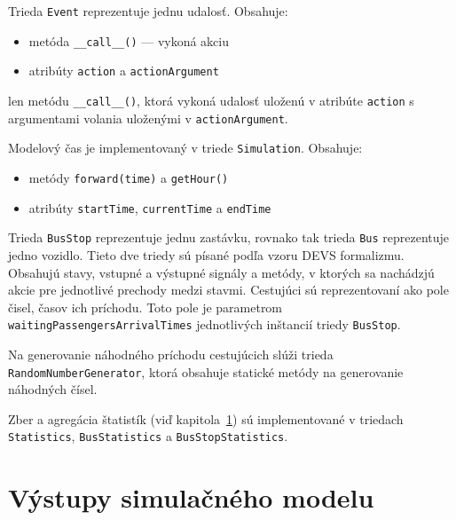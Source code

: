 Trieda \texttt{Event} reprezentuje jednu udalosť.
Obsahuje:
\begin{itemize}
  \item metóda \texttt{\_\_call\_\_()} --- vykoná akciu
  \item atribúty \texttt{action} a \texttt{actionArgument}
\end{itemize}

len metódu \texttt{\_\_call\_\_()}, ktorá vykoná udalosť uloženú v atribúte \texttt{action} s argumentami volania uloženými v \texttt{actionArgument}.

Modelový čas je implementovaný v triede \texttt{Simulation}.
Obsahuje:
\begin{itemize}
  \item metódy \texttt{forward(time)} a \texttt{getHour()}
  \item atribúty \texttt{startTime}, \texttt{currentTime} a \texttt{endTime}
\end{itemize}

Trieda \texttt{BusStop} reprezentuje jednu zastávku, rovnako tak trieda \texttt{Bus} reprezentuje jedno vozidlo.
Tieto dve triedy sú písané podľa vzoru DEVS formalizmu. Obsahujú stavy, vstupné a výstupné signály a metódy, v ktorých sa nachádzjú akcie pre jednotlivé prechody medzi stavmi.
Cestujúci sú reprezentovaní ako pole čisel, časov ich príchodu.
Toto pole je parametrom \texttt{waitingPassengersArrivalTimes} jednotlivých inštancií triedy \texttt{BusStop}.

Na generovanie náhodného príchodu cestujúcich slúži trieda \texttt{RandomNumberGenerator}, ktorá obsahuje statické metódy na generovanie náhodných čísel.

Zber a agregácia štatistík (viď kapitola~\ref{vystupy_simulacneho_modelu}) sú implementované v triedach \texttt{Statistics}, \texttt{BusStatistics} a \texttt{BusStopStatistics}.

\section{Výstupy simulačného modelu}\label{vystupy_simulacneho_modelu}

